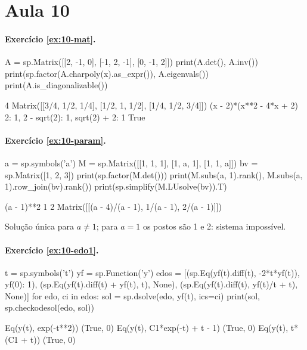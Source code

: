 \section*{Aula 10}

\paragraph{Exercício \ref{ex:10-mat}.}
\begin{entrada}
A = sp.Matrix([[2, -1, 0], [-1, 2, -1], [0, -1, 2]])
print(A.det(), A.inv())
print(sp.factor(A.charpoly(x).as_expr()), A.eigenvals())
print(A.is_diagonalizable())
\end{entrada}
\begin{saida}
4 Matrix([[3/4, 1/2, 1/4], [1/2, 1, 1/2], [1/4, 1/2, 3/4]])
(x - 2)*(x**2 - 4*x + 2) {2: 1, 2 - sqrt(2): 1, sqrt(2) + 2: 1}
True
\end{saida}

\paragraph{Exercício \ref{ex:10-param}.}
\begin{entrada}
a = sp.symbols('a')
M = sp.Matrix([[1, 1, 1], [1, a, 1], [1, 1, a]])
bv = sp.Matrix([1, 2, 3])
print(sp.factor(M.det()))
print(M.subs(a, 1).rank(), M.subs(a, 1).row_join(bv).rank())
print(sp.simplify(M.LUsolve(bv)).T)
\end{entrada}
\begin{saida}
(a - 1)**2
1 2
Matrix([[(a - 4)/(a - 1), 1/(a - 1), 2/(a - 1)]])
\end{saida}

Solução única para $a\neq1$; para $a=1$ os postos são 1 e 2: sistema impossível.

\paragraph{Exercício \ref{ex:10-edo1}.}
\begin{entrada}
t = sp.symbols('t')
yf = sp.Function('y')
edos = [(sp.Eq(yf(t).diff(t), -2*t*yf(t)), {yf(0): 1}),
        (sp.Eq(yf(t).diff(t) + yf(t), t), None),
        (sp.Eq(yf(t).diff(t), yf(t)/t + t), None)]
for edo, ci in edos:
    sol = sp.dsolve(edo, yf(t), ics=ci)
    print(sol, sp.checkodesol(edo, sol))
\end{entrada}
\begin{saida}
Eq(y(t), exp(-t**2)) (True, 0)
Eq(y(t), C1*exp(-t) + t - 1) (True, 0)
Eq(y(t), t*(C1 + t)) (True, 0)
\end{saida}

